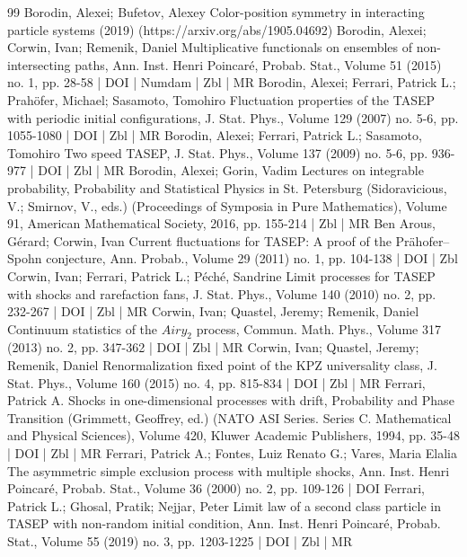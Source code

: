 \begin{thebibliography}{99}
Borodin, Alexei; Bufetov, Alexey Color-position symmetry in interacting particle systems (2019) (https://arxiv.org/abs/1905.04692)
Borodin, Alexei; Corwin, Ivan; Remenik, Daniel Multiplicative functionals on ensembles of non-intersecting paths, Ann. Inst. Henri Poincaré, Probab. Stat., Volume 51 (2015) no. 1, pp. 28-58 | DOI | Numdam | Zbl | MR
Borodin, Alexei; Ferrari, Patrick L.; Prahöfer, Michael; Sasamoto, Tomohiro Fluctuation properties of the TASEP with periodic initial configurations, J. Stat. Phys., Volume 129 (2007) no. 5-6, pp. 1055-1080 | DOI | Zbl | MR
Borodin, Alexei; Ferrari, Patrick L.; Sasamoto, Tomohiro Two speed TASEP, J. Stat. Phys., Volume 137 (2009) no. 5-6, pp. 936-977 | DOI | Zbl | MR
Borodin, Alexei; Gorin, Vadim Lectures on integrable probability, Probability and Statistical Physics in St. Petersburg (Sidoravicious, V.; Smirnov, V., eds.) (Proceedings of Symposia in Pure Mathematics), Volume 91, American Mathematical Society, 2016, pp. 155-214 | Zbl | MR
Ben Arous, Gérard; Corwin, Ivan Current fluctuations for TASEP: A proof of the Prähofer–Spohn conjecture, Ann. Probab., Volume 29 (2011) no. 1, pp. 104-138 | DOI | Zbl
Corwin, Ivan; Ferrari, Patrick L.; Péché, Sandrine Limit processes for TASEP with shocks and rarefaction fans, J. Stat. Phys., Volume 140 (2010) no. 2, pp. 232-267 | DOI | Zbl | MR
Corwin, Ivan; Quastel, Jeremy; Remenik, Daniel Continuum statistics of the ${Airy}_2$ process, Commun. Math. Phys., Volume 317 (2013) no. 2, pp. 347-362 | DOI | Zbl | MR
Corwin, Ivan; Quastel, Jeremy; Remenik, Daniel Renormalization fixed point of the KPZ universality class, J. Stat. Phys., Volume 160 (2015) no. 4, pp. 815-834 | DOI | Zbl | MR
Ferrari, Patrick A. Shocks in one-dimensional processes with drift, Probability and Phase Transition (Grimmett, Geoffrey, ed.) (NATO ASI Series. Series C. Mathematical and Physical Sciences), Volume 420, Kluwer Academic Publishers, 1994, pp. 35-48 | DOI | Zbl | MR
Ferrari, Patrick A.; Fontes, Luiz Renato G.; Vares, Maria Elalia The asymmetric simple exclusion process with multiple shocks, Ann. Inst. Henri Poincaré, Probab. Stat., Volume 36 (2000) no. 2, pp. 109-126 | DOI
Ferrari, Patrick L.; Ghosal, Pratik; Nejjar, Peter Limit law of a second class particle in TASEP with non-random initial condition, Ann. Inst. Henri Poincaré, Probab. Stat., Volume 55 (2019) no. 3, pp. 1203-1225 | DOI | Zbl | MR

\end{thebibliography}

